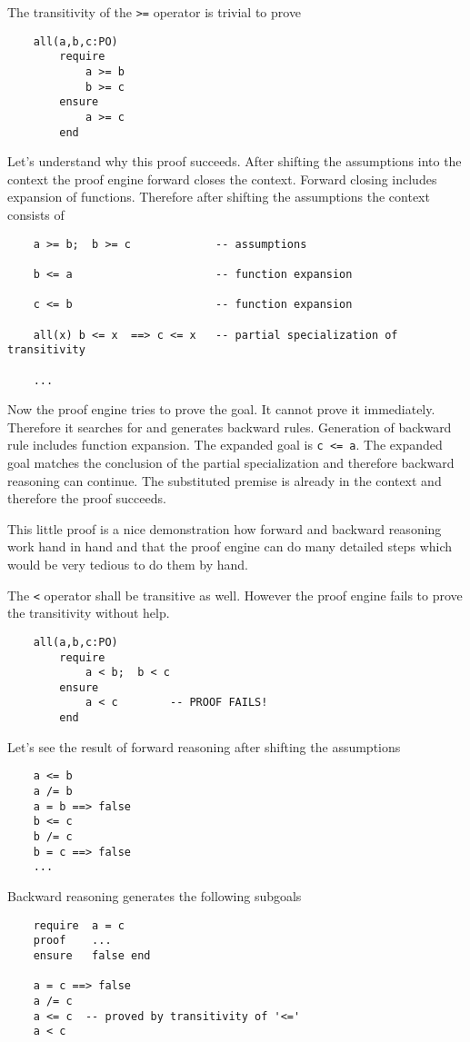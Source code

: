 The transitivity of the \lstinline!>=! operator is trivial to prove
\begin{lstlisting}
    all(a,b,c:PO)
        require
            a >= b
            b >= c
        ensure
            a >= c
        end
\end{lstlisting}

Let's understand why this proof succeeds. After shifting the assumptions into
the context the proof engine forward closes the context. Forward closing
includes expansion of functions. Therefore after shifting the assumptions the
context consists of
\begin{lstlisting}
    a >= b;  b >= c             -- assumptions

    b <= a                      -- function expansion

    c <= b                      -- function expansion

    all(x) b <= x  ==> c <= x   -- partial specialization of transitivity

    ...
\end{lstlisting}

Now the proof engine tries to prove the goal. It cannot prove it
immediately. Therefore it searches for and generates backward
rules. Generation of backward rule includes function expansion. The expanded
goal is \lstinline!c <= a!. The expanded goal matches the conclusion of the
partial specialization and therefore backward reasoning can continue. The
substituted premise is already in the context and therefore the proof
succeeds.

This little proof is a nice demonstration how forward and backward reasoning
work hand in hand and that the proof engine can do many detailed steps which
would be very tedious to do them by hand.


The \lstinline!<! operator shall be transitive as well. However the proof
engine fails to prove the transitivity without help.
%
\begin{lstlisting}
    all(a,b,c:PO)
        require
            a < b;  b < c
        ensure
            a < c        -- PROOF FAILS!
        end
\end{lstlisting}

Let's see the result of forward reasoning after shifting the assumptions
\begin{lstlisting}
    a <= b
    a /= b
    a = b ==> false
    b <= c
    b /= c
    b = c ==> false
    ...
\end{lstlisting}
Backward reasoning generates the following subgoals
\begin{lstlisting}
    require  a = c
    proof    ...
    ensure   false end

    a = c ==> false
    a /= c
    a <= c  -- proved by transitivity of '<='
    a < c
\end{lstlisting}

